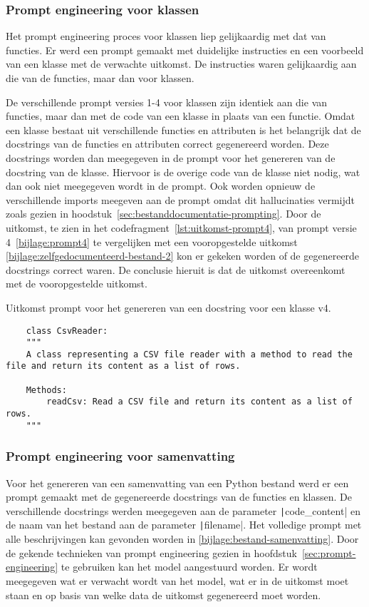 \subsubsection{Prompt engineering voor klassen}
Het prompt engineering proces voor klassen liep gelijkaardig met dat van functies.
Er werd een prompt gemaakt met duidelijke instructies en een voorbeeld van een klasse met de verwachte uitkomst.
De instructies waren gelijkaardig aan die van de functies, maar dan voor klassen.

De verschillende prompt versies 1-4 voor klassen zijn identiek aan die van functies, maar dan met de code van een klasse in plaats van een functie.
Omdat een klasse bestaat uit verschillende functies en attributen is het belangrijk dat de docstrings van de functies en attributen correct gegenereerd worden.
Deze docstrings worden dan meegegeven in de prompt voor het genereren van de docstring van de klasse.
Hiervoor is de overige code van de klasse niet nodig, wat dan ook niet meegegeven wordt in de prompt.
Ook worden opnieuw de verschillende imports meegeven aan de prompt omdat dit hallucinaties vermijdt zoals gezien in hoodstuk~\ref{sec:bestanddocumentatie-prompting}.
Door de uitkomst, te zien in het codefragment~\ref{lst:uitkomst-prompt4}, van prompt versie 4~\ref{bijlage:prompt4} te vergelijken met een vooropgestelde uitkomst \ref{bijlage:zelfgedocumenteerd-bestand-2} kon er gekeken worden of de gegenereerde docstrings correct waren.
De conclusie hieruit is dat de uitkomst overeenkomt met de vooropgestelde uitkomst. 

\begin{listing}
    \caption{Uitkomst prompt voor het genereren van een docstring voor een klasse v4.}
    \label{lst:uitkomst-prompt4}
    \begin{verbatim}
    class CsvReader:
    """
    A class representing a CSV file reader with a method to read the file and return its content as a list of rows.

    Methods:
        readCsv: Read a CSV file and return its content as a list of rows.
    """
    \end{verbatim}
\end{listing}

\subsubsection{Prompt engineering voor samenvatting}
Voor het genereren van een samenvatting van een Python bestand werd er een prompt gemaakt met de gegenereerde docstrings van de functies en klassen.
De verschillende docstrings werden meegegeven aan de parameter \texttt|code_content| en de naam van het bestand aan de parameter 
\texttt|filename|.
Het volledige prompt met alle beschrijvingen kan gevonden worden in \ref{bijlage:bestand-samenvatting}.
Door de gekende technieken van prompt engineering gezien in hoofdstuk~\ref{sec:prompt-engineering} te gebruiken kan het model aangestuurd worden.
Er wordt meegegeven wat er verwacht wordt van het model, wat er in de uitkomst moet staan en op basis van welke data de uitkomst gegenereerd moet worden.

